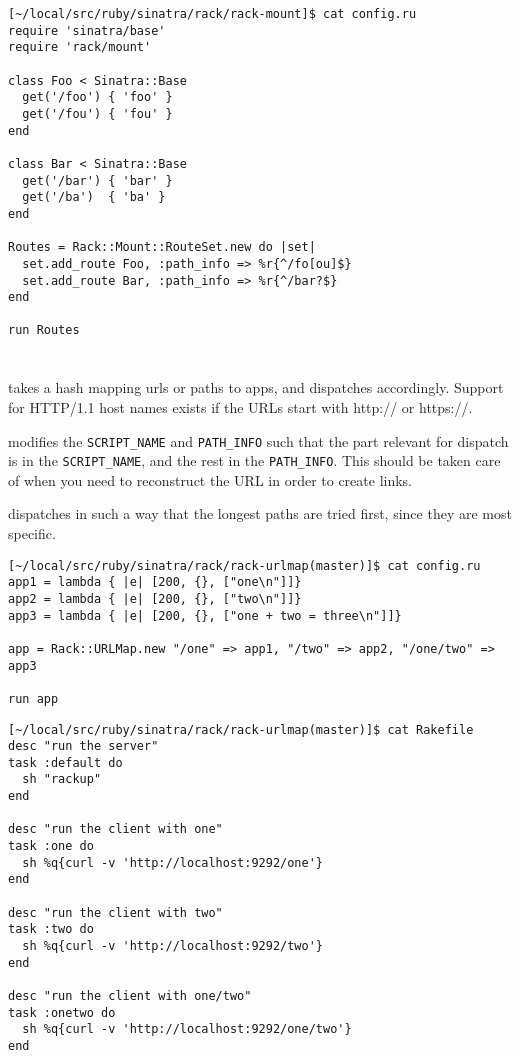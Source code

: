 \begin{verbatim}
[~/local/src/ruby/sinatra/rack/rack-mount]$ cat config.ru 
require 'sinatra/base'
require 'rack/mount'

class Foo < Sinatra::Base
  get('/foo') { 'foo' }
  get('/fou') { 'fou' }
end

class Bar < Sinatra::Base
  get('/bar') { 'bar' }
  get('/ba')  { 'ba' }
end

Routes = Rack::Mount::RouteSet.new do |set|
  set.add_route Foo, :path_info => %r{^/fo[ou]$}
  set.add_route Bar, :path_info => %r{^/bar?$}
end

run Routes
\end{verbatim}

\section{\rackurlmap{}}

\rackurlmap{} takes a hash mapping urls or paths to apps, and
dispatches accordingly. Support for HTTP/1.1 host names exists if
the URLs start with http:// or https://.

\rackurlmap{} modifies the \verb|SCRIPT_NAME| and 
\verb|PATH_INFO| such that the part
relevant for dispatch is in the 
\verb|SCRIPT_NAME|, and the rest in the
\verb|PATH_INFO|. 
This should be taken care of when you need to reconstruct
the URL in order to create links.

\rackurlmap{}  dispatches in such a way that the longest paths are
tried first, since they are most specific.



\begin{verbatim}
[~/local/src/ruby/sinatra/rack/rack-urlmap(master)]$ cat config.ru 
app1 = lambda { |e| [200, {}, ["one\n"]]}
app2 = lambda { |e| [200, {}, ["two\n"]]}
app3 = lambda { |e| [200, {}, ["one + two = three\n"]]}

app = Rack::URLMap.new "/one" => app1, "/two" => app2, "/one/two" => app3

run app
\end{verbatim}

\begin{verbatim}
[~/local/src/ruby/sinatra/rack/rack-urlmap(master)]$ cat Rakefile 
desc "run the server"
task :default do
  sh "rackup"
end

desc "run the client with one"
task :one do
  sh %q{curl -v 'http://localhost:9292/one'}
end

desc "run the client with two"
task :two do
  sh %q{curl -v 'http://localhost:9292/two'}
end

desc "run the client with one/two"
task :onetwo do
  sh %q{curl -v 'http://localhost:9292/one/two'}
end
\end{verbatim}

